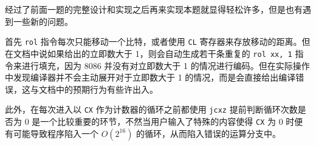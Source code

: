 经过了前面一题的完整设计和实现之后再来实现本题就显得轻松许多，但是也有遇到一些新的问题。

首先 \verb|rol| 指令每次只能移动一个比特，或者使用 \verb|CL| 寄存器来存放移动的距离。但在文档中说如果给出的立即数大于 1，则会自动生成若干条重复的 \verb|rol xx, 1| 指令来进行填充，因为 8086 并没有对立即数大于 1 的情况进行编码。但在实际操作中发现编译器并不会主动展开对于立即数大于 1 的情况，而是会直接给出编译错误，这与文档中的预期行为有些许出入。

此外，在每次进入以 \verb|CX| 作为计数器的循环之前都使用 \verb|jcxz| 提前判断循环次数是否为 0 是一个比较重要的环节，不然当用户输入了特殊的内容使得 \verb|CX| 为 0 时便有可能导致程序陷入一个 $O(2^{16})$ 的循环，从而陷入错误的运算分支中。
